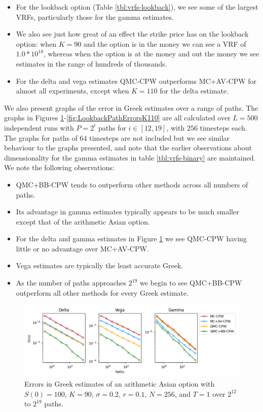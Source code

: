 \begin{itemize}
    \item For the lookback option (Table \ref{tbl:vrfs-lookback}), we see some of the largest VRFs, particularly those for the gamma estimates.
    \item We also see just how great of an effect the strike price has on the lookback option: when $K=90$ and the option is in the money we can see a VRF of $1.0 * 10^{18}$, whereas when the option is at the money and out the money we see estimates in the range of hundreds of thousands.
    \item For the delta and vega estimates QMC-CPW outperforms MC+AV-CPW for almost all experiments, except when $K=110$ for the delta estimate.
\end{itemize}

We also present graphs of the error in Greek estimates over a range of paths. The graphs in Figures \ref{fig:ArithmeticPathErrorsK90}-\ref{fig:LookbackPathErrorsK110} are all calculated over $L=500$ independent runs with $P=2^i$ paths for $i \in [12,19]$, with $256$ timesteps each. The graphs for paths of $64$ timesteps are not included but we see similar behaviour to the graphs presented, and note that the earlier observations about dimensionality for the gamma estimates in table \ref{tbl:vrfs-binary} are maintained. We note the following observations:

\begin{itemize}
    \item QMC+BB-CPW tends to outperform other methods across all numbers of paths.
    \item Its advantage in gamma estimates typically appears to be much smaller except that of the arithmetic Asian option.
    \item For the delta and gamma estimates in Figure \ref{fig:ArithmeticPathErrorsK90} we see QMC-CPW having little or no advantage over MC+AV-CPW.
    \item Vega estimates are typically the least accurate Greek.
    \item As the number of paths approaches $2^{19}$ we begin to see QMC+BB-CPW outperform all other methods for every Greek estimate.
\end{itemize}

\begin{figure}[H]
    \centering
    \includegraphics[width=1\textwidth]{figures/arithmetic path errors k=90.pdf}
    \caption{Errors in Greek estimates of an arithmetic Asian option with $S(0)=100$, $K=90$, $\sigma = 0.2$, $r=0.1$, $N=256$, and $T=1$ over $2^{12}$ to $2^{19}$ paths.}
    \label{fig:ArithmeticPathErrorsK90}
\end{figure}

